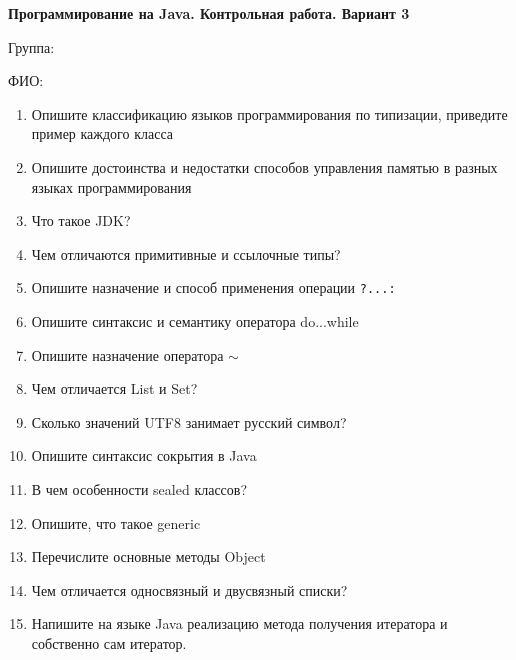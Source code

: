 \documentclass[12pt]{article}
\begin{document}
\newpage\begin{minipage}{\textwidth}
\textbf{Программирование на Java. Контрольная работа. Вариант 3}

Группа: \underline{\hspace{3cm}}

ФИО: \underline{\hspace{10cm}}

\begin{enumerate}
\item Опишите классификацию языков программирования по типизации, приведите пример каждого класса
\item Опишите достоинства и недостатки способов управления памятью в разных языках программирования
\item Что такое JDK?
\item Чем отличаются примитивные и ссылочные типы?
\item Опишите назначение и способ применения операции \verb|?...:|
\item Опишите синтаксис и семантику оператора do...while
\item Опишите назначение оператора $\sim$
\item Чем отличается List и Set?
\item Сколько значений UTF8 занимает русский символ?
\item Опишите синтаксис сокрытия в Java
\item В чем особенности sealed классов?
\item Опишите, что такое generic
\item Перечислите основные методы Object
\item Чем отличается односвязный и двусвязный списки?
\item Напишите на языке Java реализацию метода получения итератора и собственно сам итератор.

\end{enumerate}
\end{minipage}
\end{document}
